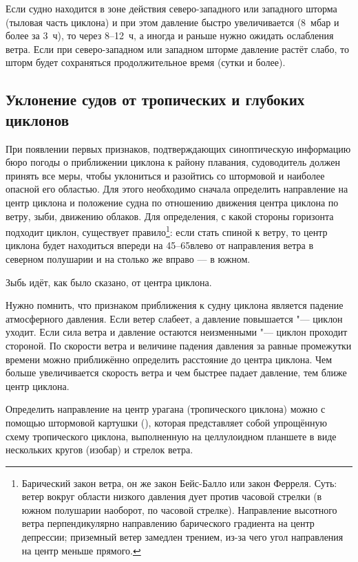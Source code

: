 Если судно находится в зоне действия северо-западного или западного
шторма (тыловая часть циклона) и при этом давление быстро
увеличивается (8~мбар и более за 3~ч), то через 8--12~ч, а иногда и
раньше нужно ожидать ослабления ветра. Если при северо-западном или
западном шторме давление растёт слабо, то шторм будет сохраняться
продолжительное время (сутки и более).

\subsection{Уклонение судов от тропических и глубоких циклонов}
\label{sec:evasion_from_cyclones}

При появлении первых признаков, подтверждающих синоптическую
информацию бюро погоды о приближении циклона к району плавания,
судоводитель должен принять все меры, чтобы уклониться и разойтись со
штормовой и наиболее опасной его областью. Для этого необходимо
сначала определить направление на центр циклона и положение судна по
отношению движения центра циклона по ветру, зыби, движению
облаков. Для определения, с какой стороны горизонта подходит циклон,
существует правило\footnote{Барический закон ветра, он же закон
  Бейс-Балло или закон Ферреля. Суть: ветер вокруг области низкого
  давления дует против часовой стрелки (в южном полушарии наоборот, по
  часовой стрелке). Направление высотного ветра перпендикулярно
  направлению барического градиента на центр депрессии; приземный
  ветер замедлен трением, из-за чего угол направления на центр меньше
  прямого.}: если
стать спиной к ветру, то центр циклона будет находиться впереди на
45--65\gr влево от направления ветра в северном полушарии и на столько
же вправо — в южном.

Зыбь идёт, как было сказано, от центра циклона.

Нужно помнить, что признаком приближения к судну циклона является
падение атмосферного давления. Если ветер слабеет, а давление
повышается "--- циклон уходит. Если сила ветра и давление остаются
неизменными "--- циклон проходит стороной. По скорости ветра и величине
падения давления за равные промежутки времени можно приближённо
определить расстояние до центра циклона. Чем больше увеличивается
скорость ветра и чем быстрее падает давление, тем ближе центр циклона.

Определить направление на центр урагана (тропического циклона) можно с
помощью штормовой картушки (), которая представляет собой
упрощённую схему тропического циклона, выполненную на целлулоидном
планшете в виде нескольких кругов (изобар) и стрелок ветра.

